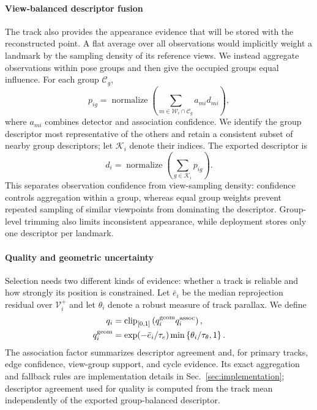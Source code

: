 \paragraph{View-balanced descriptor fusion}
The track also provides the appearance evidence that will be stored with the reconstructed point. A flat average over all observations would implicitly weight a landmark by the sampling density of its reference views. We instead aggregate observations within pose groups and then give the occupied groups equal influence. For each group $\mathcal C_g$,
\begin{equation}
p_{ig}=\operatorname{normalize}\left(
\sum_{m\in\mathcal W_i\cap\mathcal C_g}a_{mi}d_{mi}
\right),
\label{eq:group_descriptor}
\end{equation}
where $a_{mi}$ combines detector and association confidence. We identify the group descriptor most representative of the others and retain a consistent subset of nearby group descriptors; let $\mathcal K_i$ denote their indices. The exported descriptor is
\begin{equation}
d_i=\operatorname{normalize}\left(
\sum_{g\in\mathcal K_i}p_{ig}
\right).
\label{eq:descriptor}
\end{equation}
This separates observation confidence from view-sampling density: confidence controls aggregation within a group, whereas equal group weights prevent repeated sampling of similar viewpoints from dominating the descriptor. Group-level trimming also limits inconsistent appearance, while deployment stores only one descriptor per landmark.

\paragraph{Quality and geometric uncertainty}
Selection needs two different kinds of evidence: whether a track is reliable and how strongly its position is constrained. Let $\bar e_i$ be the median reprojection residual over $\mathcal V_i^+$ and let $\theta_i$ denote a robust measure of track parallax. We define
\begin{equation}
\begin{aligned}
q_i&=\operatorname{clip}_{[0,1]}\left(q_i^{\rm geom}q_i^{\rm assoc}\right),\\
q_i^{\rm geom}&=\exp(-\bar e_i/\tau_e)
\min\left\{\theta_i/\tau_\theta,1\right\}.
\end{aligned}
\label{eq:landmark_quality}
\end{equation}
The association factor summarizes descriptor agreement and, for primary tracks, edge confidence, view-group support, and cycle evidence. Its exact aggregation and fallback rules are implementation details in Sec.~\ref{sec:implementation}; descriptor agreement used for quality is computed from the track mean independently of the exported group-balanced descriptor.


